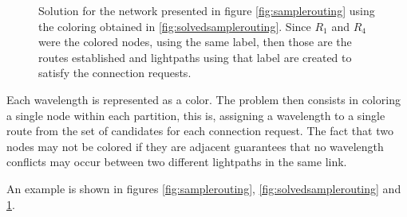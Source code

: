\begin{figure}[h]
	\centering
		\label{fig:solvedsampleroutingnetwork}
		\caption{Solution for the network presented in figure \ref{fig:samplerouting} using the coloring obtained in \ref{fig:solvedsamplerouting}. Since $R_1$ and $R_4$ were the colored nodes, using the same label, then those are the routes established and lightpaths using that label are created to satisfy the connection requests.}
	\end{figure}

Each wavelength is represented as a color. The problem then consists in coloring a single node within each partition, this is, assigning a wavelength to a single route from the set of candidates for each connection request. The fact that two nodes may not be colored if they are adjacent guarantees  that no wavelength conflicts may occur between two different lightpaths in the same link.

An example is shown in figures \ref{fig:samplerouting}, \ref{fig:solvedsamplerouting} and \ref{fig:solvedsampleroutingnetwork}.

